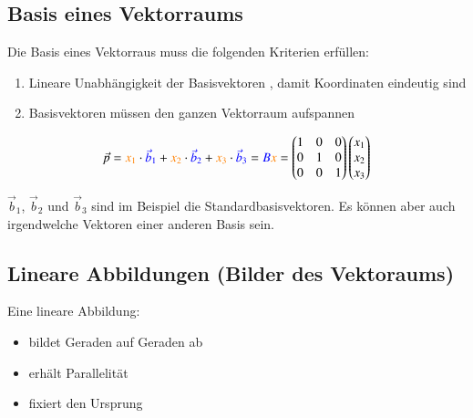 \subsection{Basis eines Vektorraums}

Die Basis eines Vektorraus muss die folgenden Kriterien erfüllen:
\vspace{0.2cm}

\begin{enumerate}
	\item Lineare Unabhängigkeit der Basisvektoren , damit Koordinaten  eindeutig sind 
	\item Basisvektoren  müssen den ganzen Vektorraum aufspannen
\end{enumerate}



$$ \vec{p} = {\color{orange}x_1} \cdot {\color{blue}\vec{b}_1} + {\color{orange}x_2} \cdot {\color{blue}\vec{b}_2} + {\color{orange}x_3} \cdot {\color{blue}\vec{b}_3}  
= {\color{blue}B} {\color{orange}x} =
\begin{pmatrix}
	1 & 0 & 0 \\
	0 & 1 & 0 \\ 
	0 & 0 & 1
\end{pmatrix}
\begin{pmatrix}
	x_1 \\ x_2 \\ x_3
\end{pmatrix} $$

$\vec{b}_1$, $\vec{b}_2$ und $\vec{b}_3$ sind im Beispiel die Standardbasisvektoren. 
Es können aber auch irgendwelche Vektoren einer anderen Basis sein.


\subsection{Lineare Abbildungen (Bilder des Vektoraums)}

Eine lineare Abbildung: 
\vspace{0.1cm}

\begin{itemize}
	\item bildet Geraden auf Geraden ab
	\item erhält Parallelität
	\item fixiert den Ursprung
\end{itemize}

